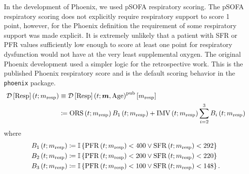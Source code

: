 \documentclass[letterpaper,10pt]{article}
\begin{document}
In the development of Phoenix, we used pSOFA respiratory
scoring\citep{Matics2017}. The pSOFA respiratory
scoring does not explicitly require respiratory support to score 1
point, however, for the Phoenix definition the requirement of some respiratory
support was made explicit.  It is extremely unlikely that a patient with SFR or
PFR values sufficiently low enough to score at least one point for respiratory
dysfunction would not have at the very least supplemental oxygen.
The original Phoenix development \citep{Sanchez-Pinto2024,Schlapbach2024} used
a simpler logic for the retrospective work. This is the published Phoenix
respiratory score and is the default scoring behavior in the \texttt{phoenix}
package.
\begin{equation}
  \label{eq:resp}
  \begin{aligned}
  \DS{Resp}[\m{resp}] &\equiv \DS{Resp}^{\mathrm{pub}}[\m{resp}] \\
  &\coloneqq
      \ORS B_1\left(t; \m{resp}\right)
      +
      \IMV \sum_{i=2}^{3} B_i\left(t; \m{resp}\right)
  \end{aligned}
\end{equation}
where
\begin{equation}
  \label{eq:resp-conditions}
  \begin{aligned}
    B_1\left(t; m_{\mathrm{resp}}\right) &\coloneqq \mathbb{I}\left\{\mathrm{PFR}\left(t; m_{\mathrm{resp}}\right) < 400 \vee \mathrm{SFR}\left(t; m_{\mathrm{resp}}\right) < 292\right\} \\
    B_2\left(t; m_{\mathrm{resp}}\right) &\coloneqq \mathbb{I}\left\{\mathrm{PFR}\left(t; m_{\mathrm{resp}}\right) < 200 \vee \mathrm{SFR}\left(t; m_{\mathrm{resp}}\right) < 220\right\} \\
    B_3\left(t; m_{\mathrm{resp}}\right) &\coloneqq \mathbb{I}\left\{\mathrm{PFR}\left(t; m_{\mathrm{resp}}\right) < 100 \vee \mathrm{SFR}\left(t; m_{\mathrm{resp}}\right) < 148\right\}.
  \end{aligned}
\end{equation}
\end{document}
